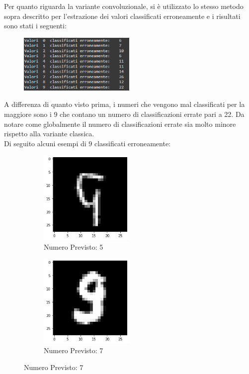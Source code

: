 \documentclass[12pt, a4paper]{article}
\begin{document}
Per quanto riguarda la variante convoluzionale, si è utilizzato lo stesso metodo sopra descritto per l'estrazione dei valori classificati erroneamente e i risultati sono stati i seguenti:
\begin{figure}[H]
    \centering
    \includegraphics[width=0.50\textwidth]{ErrateConv.png}
\end{figure}
A differenza di quanto visto prima, i numeri che vengono mal classificati per la maggiore sono i \(9\) che contano un numero di classificazioni errate pari a 22. Da notare come globalmente il numero di classificazioni errate sia molto minore rispetto alla variante classica.\\
Di seguito alcuni esempi di \(9\) classificati erroneamente:

\begin{figure}[H]
    \begin{subfigure}{0.5\textwidth}
        \centering
        \caption{Numero Previsto: 5}
        \includegraphics[width=0.50\textwidth]{nove1.png}
    \end{subfigure}
    \begin{subfigure}{0.5\textwidth}
        \centering
        \caption{Numero Previsto: 7}
        \includegraphics[width=0.50\textwidth]{nove2.png}
    \end{subfigure}
\end{figure}
\end{document}

